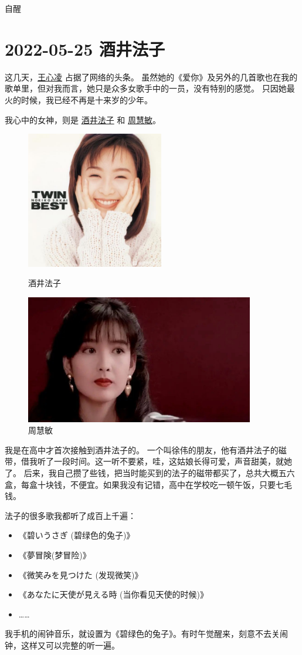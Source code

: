 \begin{taged}{自醒}
\section{2022-05-25 酒井法子}\label{sec:jjfz}
\end{taged}

这几天，\href{https://www.weibo.com/u/1504965390}{王心凌} 占据了网络的头条。
虽然她的《爱你》及另外的几首歌也在我的歌单里，但对我而言，她只是众多女歌手中的一员，没有特别的感觉。
只因她最火的时候，我已经不再是十来岁的少年。

我心中的女神，则是 \href{https://baike.baidu.com/item/酒井法子/265809}{酒井法子} 和 \href{https://baike.baidu.com/item/周慧敏/6702}{周慧敏}。

\begin{figure}[htbp]
    \centering
    \begin{minipage}{6cm}
        \centering
        \includegraphics[width=6cm]{pic/酒井法子.jpg}
        \caption*{酒井法子}
    \end{minipage}
    \quad
    \begin{minipage}{10cm}
        \centering
        \includegraphics[width=10cm]{pic/周慧敏.jpg}
        \caption*{周慧敏}
    \end{minipage}
\end{figure}

我是在高中才首次接触到酒井法子的。
一个叫徐伟的朋友，他有酒井法子的磁带，借我听了一段时间。这一听不要紧，哇，这姑娘长得可爱，声音甜美，就她了。
后来，我自己攒了些钱，把当时能买到的法子的磁带都买了，总共大概五六盒，每盒十块钱，不便宜。如果我没有记错，高中在学校吃一顿午饭，只要七毛钱。

法子的很多歌我都听了成百上千遍：

\begin{itemize}[nosep, left=\parindent]
    \item 《碧いうさぎ (碧绿色的兔子)》
    \item 《夢冒険(梦冒险)》
    \item 《微笑みを見つけた (发现微笑)》
    \item 《あなたに天使が見える時 (当你看见天使的时候)》
    \item ……
\end{itemize}

我手机的闹钟音乐，就设置为《碧绿色的兔子》。有时午觉醒来，刻意不去关闹钟，这样又可以完整的听一遍。

